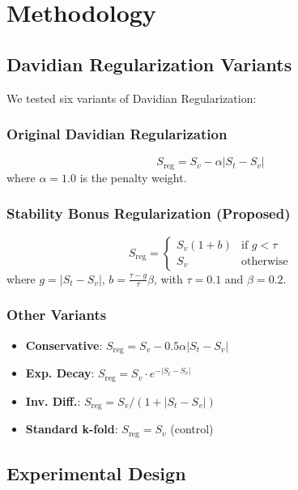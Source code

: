 \documentclass[11pt,twocolumn]{article}
\begin{document}
\section{Methodology}

\subsection{Davidian Regularization Variants}

We tested six variants of Davidian Regularization:

\subsubsection{Original Davidian Regularization}
\begin{equation}
S_{\text{reg}} = S_v - \alpha |S_t - S_v|
\end{equation}
where $\alpha = 1.0$ is the penalty weight.

\subsubsection{Stability Bonus Regularization (Proposed)}
\begin{equation}
S_{\text{reg}} = \begin{cases}
S_v (1 + b) & \text{if } g < \tau \\
S_v & \text{otherwise}
\end{cases}
\end{equation}
where $g = |S_t - S_v|$, $b = \frac{\tau - g}{\tau} \beta$, with $\tau = 0.1$ and $\beta = 0.2$.

\subsubsection{Other Variants}
{\footnotesize
\begin{itemize}
    \item \textbf{Conservative}: $S_{\text{reg}} = S_v - 0.5\alpha|S_t - S_v|$
    \item \textbf{Exp. Decay}: $S_{\text{reg}} = S_v \cdot e^{-|S_t - S_v|}$
    \item \textbf{Inv. Diff.}: $S_{\text{reg}} = S_v / (1 + |S_t - S_v|)$
    \item \textbf{Standard k-fold}: $S_{\text{reg}} = S_v$ (control)
\end{itemize}
}

\subsection{Experimental Design}
\end{document}
